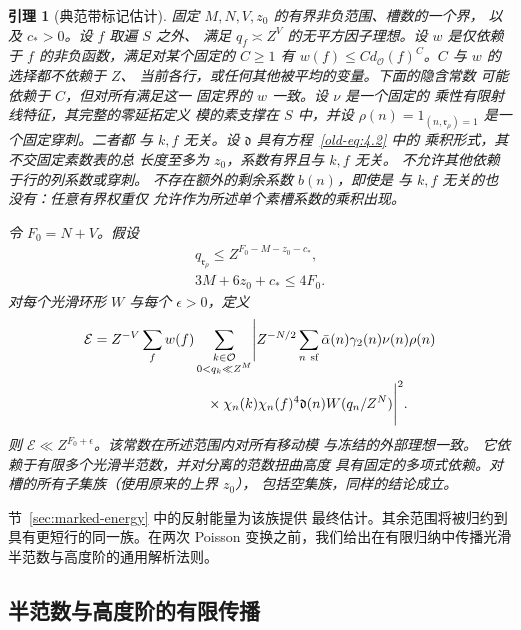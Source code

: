 \documentclass[11pt,a4paper]{article}
\numberwithin{equation}{section}
\numberwithin{figure}{section}
\newtheorem{lemma}[theorem]{引理}
\theoremstyle{definition}
\theoremstyle{remark}
\begin{document}
\begin{lemma}[典范带标记估计]\label{lem:canonical-moment}
固定 \(M,N,V,z_0\) 的有界非负范围、槽数的一个界，
以及 \(c_*>0\)。设 \(f\) 取遍 \(S\) 之外、
满足 \(q_f\asymp Z^V\) 的无平方因子理想。设 \(w\) 是仅依赖于
\(f\) 的非负函数，满足对某个固定的
\(C\ge1\) 有 \(w(f)\le C d_{\mathcal O}(f)^C\)。\(C\) 与 \(w\) 的选择都不依赖于 \(Z\)、
当前各行，或任何其他被平均的变量。下面的隐含常数
可能依赖于 \(C\)，但对所有满足这一
固定界的 \(w\) 一致。设 \(\nu\) 是一个固定的
乘性有限射线特征，其完整的零延拓定义
模的素支撑在 \(S\) 中，并设
\(\rho(n)=1_{(n,\mathfrak r_\rho)=1}\) 是一个固定穿刺。二者都
与 \(k,f\) 无关。设 \(\mathfrak d\) 具有方程~\eqref{old-eq:4.2} 中的
乘积形式，其不交固定素数表的总
长度至多为 \(z_0\)，系数有界且与 \(k,f\) 无关。
不允许其他依赖于行的列系数或穿刺。
不存在额外的剩余系数 \(b(n)\)，即使是
与 \(k,f\) 无关的也没有：任意有界权重仅
允许作为所述单个素槽系数的乘积出现。

令 \(F_0=N+V\)。假设
\begin{equation}\label{eq:invariant}
 \begin{gathered}
 q_{\mathfrak r_\rho}\le Z^{F_0-M-z_0-c_*},\\
 3M+6z_0+c_*\le4F_0.
 \end{gathered}
\end{equation}
对每个光滑环形 \(W\) 与每个 \(\epsilon>0\)，定义
\begin{equation}\label{eq:canonical-energy}
 \begin{split}
 \mathcal E={}&Z^{-V}\sum_f w(f)
 \sum_{\substack{k\in\mathcal O\\0<q_k\ll Z^M}}
 \Biggl|Z^{-N/2}\sum_{n\ {\rm sf}}
 \bar\alpha(n)\gamma_2(n)\nu(n)\rho(n)\\
 &\hspace{24mm}\times
 \chi_n(k)\chi_n(f)^4\mathfrak d(n)W(q_n/Z^N)\Biggr|^2.
 \end{split}
\end{equation}
则 \(\mathcal E\ll Z^{F_0+\epsilon}\)。该常数在所述范围内对所有移动模
与冻结的外部理想一致。
它依赖于有限多个光滑半范数，并对分离的范数扭曲高度
具有固定的多项式依赖。对槽的所有子集族（使用原来的上界 \(z_0\)），
包括空集族，同样的结论成立。
\end{lemma}

节~\ref{sec:marked-energy} 中的反射能量为该族提供
最终估计。其余范围将被归约到
具有更短行的同一族。在两次 Poisson
变换之前，我们给出在有限归纳中传播光滑
半范数与高度阶的通用解析法则。

\subsection{半范数与高度阶的有限传播}\label{sec:moment-propagation}
\end{document}
